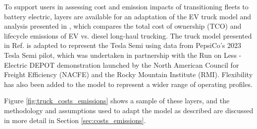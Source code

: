To support users in assessing cost and emission impacts of transitioning fleets to battery electric, layers are available for an adaptation of the EV truck model and analysis presented in \cite{Sader_2023}, which compares the total cost of ownership (TCO) and lifecycle emissions of EV vs. diesel long-haul trucking. The truck model presented in Ref. \cite{Sader_2023} is adapted to represent the Tesla Semi using data from PepsiCo's 2023 Tesla Semi pilot, which was undertaken in partnership with the Run on Less - Electric DEPOT demonstration \cite{NACFE_2023} launched by the North American Council for Freight Efficiency (NACFE) and the Rocky Mountain Institute (RMI). Flexibility has also been added to the model to represent a wider range of operating profiles. 

Figure \ref{fig:truck_costs_emissions} shows a sample of these layers, and the methodology and assumptions used to adapt the model as described are discussed in more detail in Section \ref{sec:costs_emissions}.


